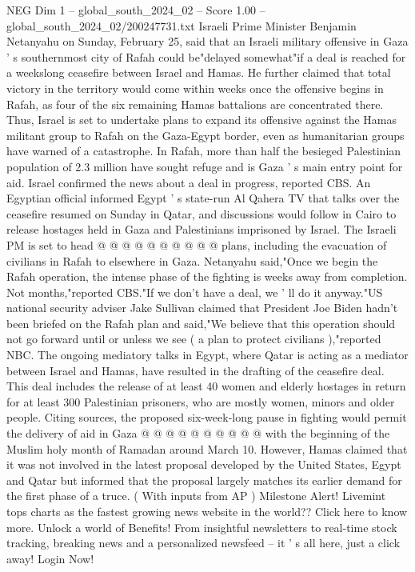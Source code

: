 \begin{textsample}{NEG Dim 1 – global\_south\_2024\_02 – Score 1.00 – global\_south\_2024\_02/200247731.txt}  \label{ex:f1_neg_252}
Israeli Prime Minister Benjamin Netanyahu on Sunday, February 25, said that an Israeli military offensive in Gaza ' s southernmost city of Rafah could be"delayed somewhat"if a deal is reached for a weekslong ceasefire between Israel and Hamas.
He further claimed that total victory in the territory would come within weeks once the offensive begins in Rafah, as four of the six remaining Hamas battalions are concentrated there.
Thus, Israel is set to undertake plans to expand its offensive against the Hamas militant group to Rafah on the Gaza-Egypt border, even as humanitarian groups have warned of a catastrophe.
In Rafah, more than half the besieged Palestinian population of 2.3 million have sought refuge and is Gaza ' s main entry point for aid.
Israel confirmed the news about a deal in progress, reported CBS.
An Egyptian official informed Egypt ' s state-run Al Qahera TV that talks over the ceasefire resumed on Sunday in Qatar, and discussions would follow in Cairo to release hostages held in Gaza and Palestinians imprisoned by Israel.
The Israeli PM is set to head @ @ @ @ @ @ @ @ @ @ plans, including the evacuation of civilians in Rafah to elsewhere in Gaza.
Netanyahu said,"Once we begin the Rafah operation, the intense phase of the fighting is weeks away from completion.
Not months,"reported CBS."If we don't have a deal, we ' ll do it anyway."US national security adviser Jake Sullivan claimed that President Joe Biden hadn't been briefed on the Rafah plan and said,"We believe that this operation should not go forward until or unless we see ( a plan to protect civilians ),"reported NBC.
The ongoing mediatory talks in Egypt, where Qatar is acting as a mediator between Israel and Hamas, have resulted in the drafting of the ceasefire deal.
This deal includes the release of at least 40 women and elderly hostages in return for at least 300 Palestinian prisoners, who are mostly women, minors and older people.
Citing sources, the proposed six-week-long pause in fighting would permit the delivery of aid in Gaza @ @ @ @ @ @ @ @ @ @ with the beginning of the Muslim holy month of Ramadan around March 10.
However, Hamas claimed that it was not involved in the latest proposal developed by the United States, Egypt and Qatar but informed that the proposal largely matches its earlier demand for the first phase of a truce. ( With inputs from AP ) Milestone Alert!
Livemint tops charts as the fastest growing news website in the world??
Click here to know more.
Unlock a world of Benefits!
From insightful newsletters to real-time stock tracking, breaking news and a personalized newsfeed -- it ' s all here, just a click away!
Login Now!

\end{textsample}
